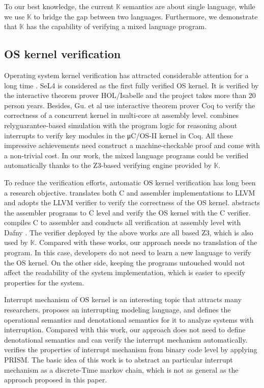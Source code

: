 \documentclass[letterpaper, 10 pt, conference]{IEEEtran}
\begin{document}
To our best knowledge, the current $\mathbb{K}$ semantics are about single language, while we use $\mathbb{K}$ to bridge the gap between two languages. Furthermore, we demonstrate that $\mathbb{K}$ has the capability of verifying a mixed language program.

\subsection{OS kernel verification}
Operating system kernel verification has attracted considerable
attention for a long time \cite{zhao}. SeL4 \cite{Sel4} is considered as the first fully verified OS kernel. It is verified by the interactive theorem prover
HOL/Isabelle \cite{Isabelle} and the project takes more than 20 person years. Besides, Gu. et al \cite{Gu} use interactive theorem
prover Coq \cite{coq} to verify the correctness of a concurrent kernel in
multi-core at assembly level. \cite{ucos} combines relyguarantee-based
simulation with the program logic for reasoning
about interrupts to verify key modules in the μC/OS-II kernel
in Coq. All these impressive achievements need construct
a machine-checkable proof and come with a non-trivial cost. In our work, the mixed language programs could be verified automatically thanks to the Z3-based \cite{Z3} verifying engine provided by $\mathbb{K}$.

To reduce the verification efforts, automatic OS kernel verification has long been a research objective. \cite{hyperkernel} translates both C and assembler implementations to LLVM \cite{llvm} and adopts the LLVM verifier to verify the correctness of the OS kernel. \cite{ding} abstracts the assembler programs to C level and verify the OS kernel with the C verifier. \cite{Ironclad} compiles C to assembler and conducts all
verification at assembly level with Dafny \cite{dafny}. The verifier deployed by the above works are all based Z3, which is also used by $\mathbb{K}$. Compared with these works, our approach needs no translation of the program. In this case, developers do not need to learn a new language to verify the OS kernel. On the other side, keeping the programs untouched would not affect the readability of the system implementation, which is easier to specify properties for the system.
\par Interrupt mechanism of OS kernel is an interesting topic that attracts many researchers. \cite{huang} proposes an interrupting modeling language, and defines the operational semantics and denotational semantics for it to analyze systems with interruption. Compared with this work, our approach does not need to define denotational semantics and can verify the interrupt mechanism automatically. \cite{shi} verifies the properties of interrupt mechanism from binary code level by applying PRISM. The basic idea of this work is to abstract an particular interrupt mechanism as a discrete-Time markov chain, which is not as general as the approach proposed in this paper.
\end{document}
